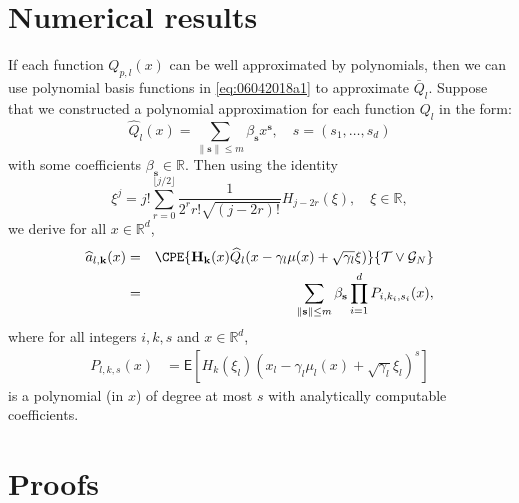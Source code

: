 \documentclass[aap,preprint]{imsart}
\def\rset{\mathbb{R}}
\def\TrainSet{\mathcal{T}}
\begin{document}
\section{Numerical results}
\label{sec:num}
If each function  \(Q_{p,l}(x) \) can be well approximated by polynomials, then we can use polynomial basis functions in   \eqref{eq:06042018a1} to approximate \(\bar Q_l\). Suppose that we constructed a polynomial approximation  for each function \(Q_{l}\)  in the form:
\begin{equation*}
\widehat{Q}_{l}(x) = \sum_{\|\mathbf{s}\|\leq m} \beta_{\mathbf{s}} x^{\mathbf{s}},\quad s=(s_1,\ldots,s_d)
\end{equation*}
with some coefficients \(\beta_{\mathbf{s}}\in \mathbb{R}.\)
Then using the identity
\[
\xi^j = j! \sum_{r = 0}^{\lfloor j/2 \rfloor} \frac{1}{2^r  r! \sqrt{(j-2r)!}} H_{j-2r}(\xi),\quad \xi \in \mathbb{R},
\]
we derive for all $x \in \mathbb{R}^d$, 
\begin{eqnarray*}
\widehat a_{l,\mathbf{k}} (x) &=&\CPE{\mathbf{H}_\mathbf{k}(x) \widehat{Q}_{l}(x - \gamma_l \mu(x) + \sqrt{\gamma_l}\xi)}{\TrainSet \vee \mathcal{G}_N} 
\\
&=& \sum_{\|\mathbf{s}\|\leq m} \beta_{\mathbf{s}} \prod_{i=1}^d P_{i,k_i,s_i}(x),
\end{eqnarray*}
where for all integers $i,k,s$ and $x \in \rset^d$,
\begin{align*}
P_{l,k,s}(x) &= \mathsf{E} \left[ H_{k}(\xi_l) (x_l - \gamma_l \mu_l(x) + \sqrt{\gamma_l} \xi_l)^{s} \right]
\end{align*}
is a polynomial (in \(x\)) of degree at most \(s\) with analytically computable coefficients. 

\section{Proofs}
\label{sec:proofs}
\end{document}
